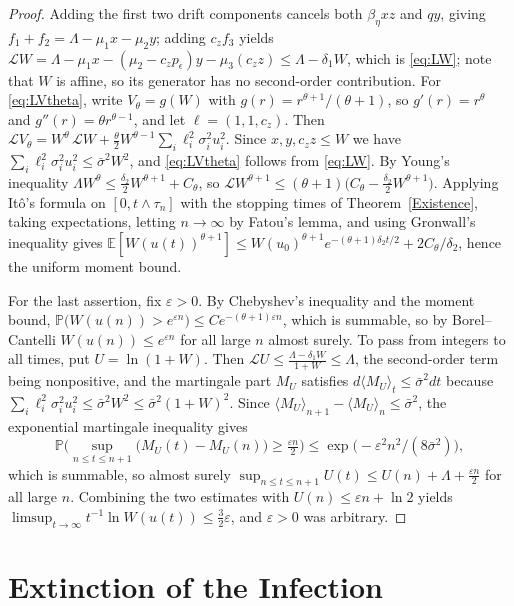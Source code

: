 \documentclass{article}
\newcommand{\betaeta}{\beta_\eta}
\newcommand{\peps}{p_\epsilon}
\begin{document}
\begin{proof}
Adding the first two drift components cancels both $\betaeta xz$ and $qy$, giving $f_1+f_2=\Lambda-\mu_1x-\mu_2y$; adding $c_zf_3$ yields
$\mathcal{L}W=\Lambda-\mu_1x-(\mu_2-c_z\peps)y-\mu_3(c_zz)\le\Lambda-\delta_1W$, which is \eqref{eq:LW}; note that $W$ is affine, so its generator has no second-order contribution. For \eqref{eq:LVtheta}, write $V_\theta=g(W)$ with $g(r)=r^{\theta+1}/(\theta+1)$, so $g'(r)=r^\theta$ and $g''(r)=\theta r^{\theta-1}$, and let $\ell=(1,1,c_z)$. Then
$\mathcal{L}V_\theta=W^\theta\,\mathcal{L}W+\tfrac{\theta}{2}W^{\theta-1}\sum_i\ell_i^2\sigma_i^2u_i^2$.
Since $x,y,c_zz\le W$ we have $\sum_i\ell_i^2\sigma_i^2u_i^2\le\bar\sigma^2W^2$, and \eqref{eq:LVtheta} follows from \eqref{eq:LW}. By Young's inequality $\Lambda W^\theta\le\tfrac{\delta_2}{2}W^{\theta+1}+C_\theta$, so $\mathcal{L}W^{\theta+1}\le(\theta+1)\big(C_\theta-\tfrac{\delta_2}{2}W^{\theta+1}\big)$. Applying It\^o's formula on $[0,t\wedge\tau_n]$ with the stopping times of Theorem~\ref{Existence}, taking expectations, letting $n\to\infty$ by Fatou's lemma, and using Gronwall's inequality gives
$\mathbb{E}[W(u(t))^{\theta+1}]\le W(u_0)^{\theta+1}e^{-(\theta+1)\delta_2t/2}+2C_\theta/\delta_2$, hence the uniform moment bound.

For the last assertion, fix $\varepsilon>0$. By Chebyshev's inequality and the moment bound, $\mathbb{P}\big(W(u(n))>e^{\varepsilon n}\big)\le Ce^{-(\theta+1)\varepsilon n}$, which is summable, so by Borel--Cantelli $W(u(n))\le e^{\varepsilon n}$ for all large $n$ almost surely. To pass from integers to all times, put $U=\ln(1+W)$. Then $\mathcal{L}U\le\frac{\Lambda-\delta_1W}{1+W}\le\Lambda$, the second-order term being nonpositive, and the martingale part $M_U$ satisfies $d\langle M_U\rangle_t\le\bar\sigma^2dt$ because $\sum_i\ell_i^2\sigma_i^2u_i^2\le\bar\sigma^2W^2\le\bar\sigma^2(1+W)^2$. Since $\langle M_U\rangle_{n+1}-\langle M_U\rangle_n\le\bar\sigma^2$, the exponential martingale inequality gives
\[
\mathbb{P}\Big(\sup_{n\le t\le n+1}\big(M_U(t)-M_U(n)\big)\ge \tfrac{\varepsilon n}{2}\Big)\le\exp\big(-\varepsilon^2n^2/(8\bar\sigma^2)\big),
\]
which is summable, so almost surely $\sup_{n\le t\le n+1}U(t)\le U(n)+\Lambda+\tfrac{\varepsilon n}{2}$ for all large $n$. Combining the two estimates with $U(n)\le\varepsilon n+\ln2$ yields $\limsup_{t\to\infty}t^{-1}\ln W(u(t))\le\tfrac32\varepsilon$, and $\varepsilon>0$ was arbitrary.
\end{proof}

\section{Extinction of the Infection}\label{sec:extinction}
\end{document}

